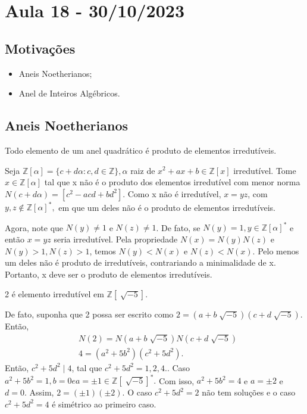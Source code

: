 \documentclass[AlgebraII/algebraII_notes.tex]{subfiles}
\begin{document}
\section{Aula 18 - 30/10/2023}
\subsection{Motivações}
\begin{itemize}
	\item Aneis Noetherianos;
	\item Anel de Inteiros Algébricos.
\end{itemize}
\subsection{Aneis Noetherianos}
\begin{prop*}
	Todo elemento de um anel quadrático é produto de elementos irredutíveis.
\end{prop*}
\begin{proof*}
	Seja \(\mathbb{Z}[\alpha ] = \{c + d\alpha : c, d\in \mathbb{Z}\}, \alpha \) raiz de \(x^{2} + ax + b\in \mathbb{Z}[x]\) irredutível.
	Tome \(x\in \mathbb{Z}[\alpha ]\) tal que x não é o produto dos elementos irredutível com menor norma \(N(c+d\alpha ) = [c^{2}-acd + bd^{2}]\).
	Como x não é irredutível, \(x=yz\), com \(y,z\not\in \mathbb{Z}[\alpha ]^{*},\) em que um deles não é o produto de elementos
	irredutíveis.

	Agora, note que \(N(y)\neq1\) e \(N(z)\neq1\). De fato, se \(N(y)=1, y\in \mathbb{Z}[\alpha ]^{*}\) e então \(x=yz\) seria irredutível.
	Pela propriedade \(N(x) = N(y)N(z)\) e \(N(y) > 1, N(z) > 1\), temos \(N(y) < N(x)\) e \(N(z) < N(x)\).
	Pelo menos um deles não é produto de irredutíveis, contrariando a minimalidade de x. Portanto, x deve ser o produto
	de elementos irredutíveis. \qedsymbol
\end{proof*}
\begin{example}
	2 é elemento irredutível em \(\mathbb{Z}[\sqrt[]{-5}].\)

	De fato, suponha que 2 possa ser escrito como \(2 = (a + b\sqrt[]{-5})(c+d\sqrt[]{-5}).\) Então,
	\begin{align*}
		 & N(2) = N(a+b\sqrt[]{-5})N(c+d\sqrt[]{-5}) \\
		 & 4 = (a^{2} + 5b^{2})(c^{2}+5d^{2}).
	\end{align*}
	Então, \(c^{2} + 5d^{2}\mid 4\), tal que \(c^{2} + 5d^{2} = 1, 2, 4.\). Caso \(a^{2}+5b^{2} = 1, b = 0 e a = \pm 1\in \mathbb{Z}[\sqrt[]{-5}]^{*}.\)
	Com isso, \(a^{2} + 5b^{2} = 4\) e \(a = \pm 2\) e \(d=0.\) Assim, \(2=(\pm1)(\pm2).\)
	O caso \(c^{2} + 5d^{2} = 2\) não tem soluções e o caso \(c^{2} + 5d^{2} = 4\) é simétrico ao primeiro caso.
\end{example}
\end{document}
